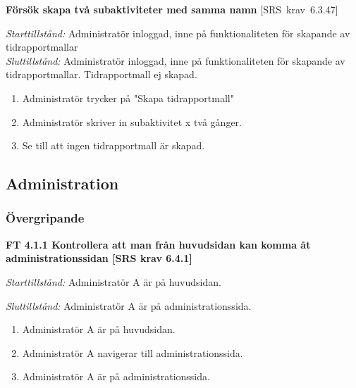 \documentclass[a4paper]{article}
\def\reqinside{\hfil\penalty 100 \hfilneg \hbox}
\def \req [#1]{\reqinside{[SRS krav #1]}}
\begin{document}
\begin{FT}
\item
\textbf{Försök skapa två subaktiviteter med samma namn} \req[6.3.47]

\emph{Starttillstånd:} Administratör inloggad, inne på funktionaliteten för skapande av tidrapportmallar\\
\emph{Sluttillstånd:} Administratör inloggad, inne på funktionaliteten för skapande av tidrapportmallar. Tidrapportmall ej skapad.\\

\begin{enumerate}
\item Administratör trycker på "Skapa tidrapportmall"
\item Administratör skriver in subaktivitet x två gånger.
\item Se till att ingen tidrapportmall är skapad.
\end{enumerate}

\end{FT}






\subsection{Administration}

\subsubsection{Övergripande}

\textbf{FT 4.1.1 Kontrollera att man från huvudsidan kan komma åt administrationssidan [SRS krav 6.4.1]}

\emph{Starttillstånd:}  Administratör A är på huvudsidan.

\emph{Sluttillstånd:} Administratör A är på administrationssida.

\begin{enumerate}
\item Administratör A är på huvudsidan.
\item Administratör A navigerar till administrationssida.
\item Administratör A är på administrationssida. 
\end{enumerate}
\end{document}
